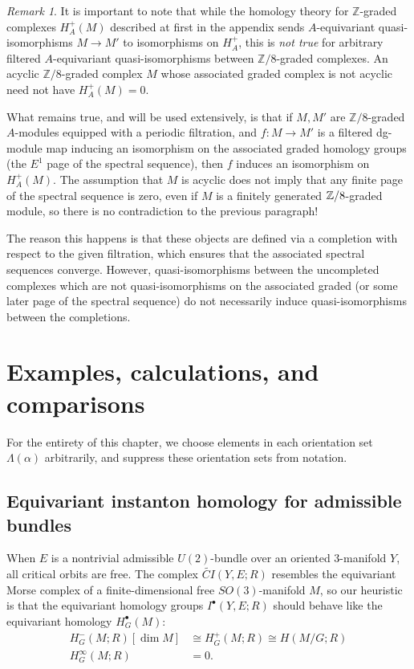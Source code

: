 \documentclass{memo-l}
\theoremstyle{definition}
\theoremstyle{remark}
\newtheorem{remark}[theorem]{Remark}
\numberwithin{section}{chapter}
\numberwithin{equation}{chapter}
\begin{document}
\begin{remark}It is important to note that while the homology theory for $\mathbb Z$-graded complexes $H_A^+(M)$ described at first in the appendix sends $A$-equivariant quasi-isomorphisms $M \to M'$ to isomorphisms on $H_A^+$, this is \emph{not true} for arbitrary filtered $A$-equivariant quasi-isomorphisms between $\mathbb Z/8$-graded complexes. An acyclic $\mathbb Z/8$-graded complex $M$ whose associated graded complex is not acyclic need not have $H_A^+(M) = 0$. 

What remains true, and will be used extensively, is that if $M, M'$ are $\mathbb Z/8$-graded $A$-modules equipped with a periodic filtration, and $f: M \to M'$ is a filtered dg-module map inducing an isomorphism on the associated graded homology groups (the $E^1$ page of the spectral sequence), then $f$ induces an isomorphism on $H_A^+(M)$. The assumption that $M$ is acyclic does not imply that any finite page of the spectral sequence is zero, even if $M$ is a finitely generated $\Bbb Z/8$-graded module, so there is no contradiction to the previous paragraph! %

The reason this happens is that these objects are defined via a completion with respect to the given filtration, which ensures that the associated spectral sequences converge. However, quasi-isomorphisms between the uncompleted complexes which are not quasi-isomorphisms on the associated graded (or some later page of the spectral sequence) do not necessarily induce quasi-isomorphisms between the completions.\end{remark}

\chapter{Examples, calculations, and comparisons}\label{chap:7}
For the entirety of this chapter, we choose elements in each orientation set $\Lambda(\alpha)$ arbitrarily, and suppress these orientation sets from notation.

\section{Equivariant instanton homology for admissible bundles}\label{sec:ex-admissible}
When $E$ is a nontrivial admissible $U(2)$-bundle over an oriented 3-manifold $Y$, all critical orbits are free. The complex $\widetilde{CI}(Y,E;R)$ resembles the equivariant Morse complex of a finite-dimensional free $SO(3)$-manifold $M$, so our heuristic is that the equivariant homology groups $I^\bullet(Y,E;R)$ should behave like the equivariant homology $H^\bullet_G(M)$: 
\begin{align*}H^-_G(M;R)[\dim M] &\cong H^+_G(M;R) \cong H(M/G;R)\\
H^\infty_G(M;R) &= 0.\end{align*}
\end{document}
